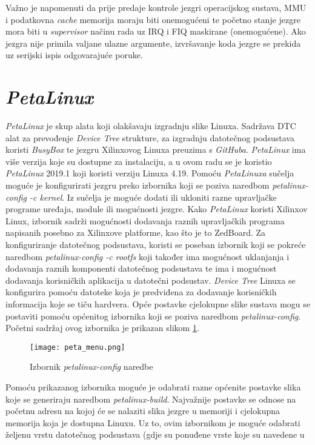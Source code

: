 \documentclass[times, utf8, diplomski, numeric]{fer}
\begin{document}
Važno je napomenuti da prije predaje kontrole jezgri operacijskog sustava, MMU i podatkovna \textit{cache} memorija moraju biti
onemogućeni te početno stanje jezgre mora biti u \textit{supervisor} načinu rada uz IRQ i FIQ maskirane (onemogućene). Ako
jezgra nije primila valjane ulazne argumente, izvršavanje koda jezgre se prekida uz serijski ispis odgovarajuće poruke.

\section{\textit{PetaLinux}}
\textit{PetaLinux} je skup alata koji olakšavaju izgradnju slike Linuxa. Sadržava DTC alat za prevođenje \textit{Device Tree}
strukture, za izgradnju datotečnog podsustava koristi \textit{BusyBox} te jezgru Xilinxovog Linuxa preuzima s \textit{GitHuba}.
\textit{PetaLinux} ima više verzija koje su dostupne za instalaciju, a u ovom radu se je koristio \textit{PetaLinux} 2019.1 koji
koristi verziju Linuxa 4.19. Pomoću \textit{PetaLinuxa} sučelja moguće je konfigurirati jezgru preko izbornika koji se poziva
naredbom \textit{petalinux-config -c kernel}. Iz sučelja je moguće dodati ili ukloniti razne upravljačke programe uređaja,
module ili mogućnosti jezgre. Kako \textit{PetaLinux} koristi Xilinxov Linux, izbornik sadrži mogućnosti dodavanja raznih
upravljačkih programa napisanih posebno za Xilinxove platforme, kao što je to ZedBoard. Za konfiguriranje datotečnog podsustava,
koristi se poseban izbornik koji se pokreće naredbom \textit{petalinux-config -c rootfs} koji također ima mogućnost uklanjanja
i dodavanja raznih komponenti datotečnog podsustava te ima i mogućnost dodavanja korisničkih aplikacija u datotečni  podsustav.
\textit{Device Tree} Linuxa se konfigurira pomoću datoteke koja je predviđena za dodavanje korisničkih informacija koje se tiču
hardvera. Opće postavke cjelokupne slike sustava mogu se postaviti pomoću općenitog izbornika koji se poziva naredbom
\textit{petalinux-config}. Početni sadržaj ovog izbornika je prikazan slikom \ref{peta_menu}.
\begin{figure}[H]
  \centering
	\texttt{[image: peta\_menu.png]}%
	\caption{Izbornik \textit{petalinux-config} naredbe}
	\label{peta_menu}%
\end{figure}
Pomoću prikazanog izbornika
moguće je odabrati razne općenite postavke slika koje se generiraju naredbom \textit{petalinux-build}. Najvažnije postavke
se odnose na početnu adresu na kojoj će se nalaziti slika jezgre u memoriji i cjelokupna memorija koja je dostupna Linuxu.
Uz to, ovim izbornikom je moguće odabrati željenu vrstu datotečnog podsustava (gdje su ponuđene vrste koje su navedene u
\end{document}
